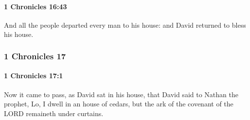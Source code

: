 		\paragraph{1 Chronicles 16:43} %
			\label{1CHRONICLES-16-43}

			And all the people departed every man to his house: and David returned to bless his house.

	\subsubsection{1 Chronicles 17} %
		\label{1CHRONICLES-17}

		\paragraph{1 Chronicles 17:1} %
			\label{1CHRONICLES-17-1}

			Now it came to pass, as David sat in his house, that David said to Nathan the prophet, Lo, I dwell in an house of cedars, but the ark of the covenant of the LORD remaineth under curtains.

